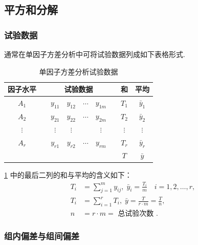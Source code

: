 \subsection{平方和分解}\label{ssec:8.1.3}
\subsubsection{试验数据}

通常在单因子方差分析中可将试验数据列成如下表格形式. 

\begin{table}[htbp]
  \centering
  \caption{单因子方差分析试验数据}
    \begin{tabular}{ccccccccc}
    \toprule
    因子水平  &       & \multicolumn{4}{c}{试验数据}      &       & 和     & 平均 \\
    \midrule
    $A_1$    &       & $y_{11}$   & $y_{12}$   & $\cdots$ & $y_{1m}$   &       & $T_1$    & $\bar{y}_{1}$ \\
    $A_2$    &       & $y_{21}$   & $y_{22}$   & $\cdots$  & $y_{2m}$   &       & $T_2$    & $\bar{y}_{2}$ \\
    $\vdots$ &       & $\vdots$    & $\vdots$   &       &   $\vdots$  &       &  $\vdots$   & $\vdots$ \\
    $A_r$    &       & $y_{r1}$   & $y_{r2}$   & $\cdots$   & $y_{rm}$   &       & $T_r$    & $\bar{y}_{r}$ \\
    \midrule
          &       &       &       &       &       &       & $T$     & $\bar{y}$ \\
    \bottomrule
    \end{tabular}%
  \label{tab:8.1.2}%
\end{table}%
\ref{tab:8.1.2} 中的最后二列的和与平均的含义如下：
\begin{align*}
  T_i &= \sum_{j=1}^{m} y_{ij},\; \bar{y}_i = \frac{T_i}{m} \quad i =1,2,\ldots,r,\\
  T_i & = \sum_{i=1}^{r} T_{i},\; \bar{y} = \frac{T}{r \cdot m} = \frac{T}{n},\\
  n & = r \cdot m = \text{ 总试验次数 }.
\end{align*}

\subsubsection{组内偏差与组间偏差}

